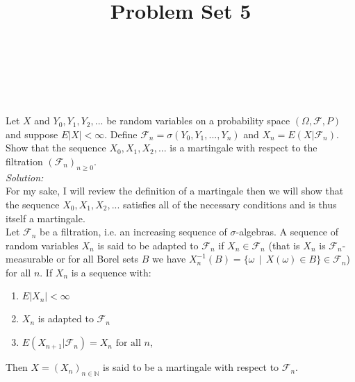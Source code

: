 \documentclass[10pt]{amsart}
\begin{document}
\noindent
{} \\
 \\
 \\
\title{Problem Set 5}
\maketitle

 Let $X$ and $Y_0, Y_1, Y_2, . . .$ be random variables on a probability space $(\Omega, \mathcal{F},P)$ and suppose $E|X| < \infty$. Define $\mathcal{F}_n=\sigma(Y_0,Y_1,...,Y_n)$ and $X_n = E(X|\mathcal{F}_n)$. Show that the sequence $X_0, X_1, X_2,...$ is a martingale with respect to the filtration $(\mathcal{F}_n)_{n \geq 0}$. \\

\noindent
\textit{Solution:} \\
For my sake, I will review the definition of a martingale then we will show that the sequence $X_0, X_1, X_2, ...$ satisfies all of the necessary conditions and is thus itself a martingale. \\

\noindent
Let $\mathcal F_n$ be a filtration, i.e. an increasing sequence of $\sigma$-algebras.
A sequence of random variables $X_n$ is said to be adapted to $\mathcal F_n$ if $X_n \in \mathcal F_n$
(that is $X_n$ is $\mathcal F_n$-measurable or for all Borel sets $B$ we have $X_n^{-1}(B) = \{\omega \:\: | \:\: X(\omega) \in B\} \in \mathcal F_n$)
for all $n$.
If $X_n$ is a sequence with:
\begin{enumerate}
\item  $E | X_n | < \infty$
\item $X_n$ is adapted to $\mathcal F_n$
\item $E ( X_{n + 1} | \mathcal F_n ) = X_n \text{ for all } n$,
\end{enumerate}
Then $X = (X_n)_{n \in \mathbb N}$ is said to be a martingale with respect to $\mathcal F_n$. \\
\end{document}
